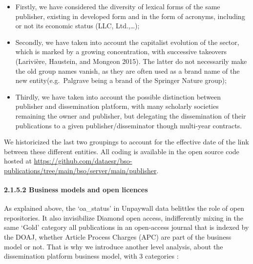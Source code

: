 \documentclass[
]{article}
\begin{document}
\begin{itemize}
\item
  Firstly, we have considered the diversity of lexical forms of the same
  publisher, existing in developed form and in the form of acronyms,
  including or not its economic status (LLC, Ltd.,\ldots);
\item
  Secondly, we have taken into account the capitalist evolution of the
  sector, which is marked by a growing concentration, with successive
  takeovers (Larivière, Haustein, and Mongeon 2015). The latter do not
  necessarily make the old group names vanish, as they are often used as
  a brand name of the new entity(e.g.~Palgrave being a brand of the
  Springer Nature group);
\item
  Thirdly, we have taken into account the possible distinction between
  publisher and dissemination platform, with many scholarly societies
  remaining the owner and publisher, but delegating the dissemination of
  their publications to a given publisher/disseminator though multi-year
  contracts.
\end{itemize}

We historicized the last two groupings to account for the effective date
of the link between these different entities. All coding is available in
the open source code hosted at
\url{https://github.com/dataesr/bso-publications/tree/main/bso/server/main/publisher}.

\hypertarget{business-models-and-open-licences}{%
\paragraph{2.1.5.2 Business models and open
licences}\label{business-models-and-open-licences}}

As explained above, the `oa\_status' in Unpaywall data belittles the
role of open repositories. It also invisibilize Diamond open access,
indifferently mixing in the same `Gold' category all publications in an
open-access journal that is indexed by the DOAJ, whether Article Process
Charges (APC) are part of the business model or not. That is why we
introduce another level analysis, about the dissemination platform
business model, with 3 categories :
\end{document}
